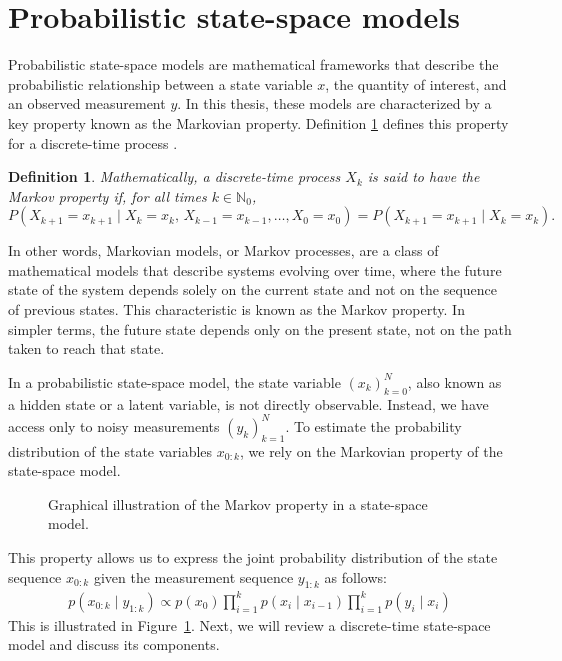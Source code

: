 \documentclass[dissertation,math,vertlayout,pdfa,colorlinks,nologo]{aaltoseries}
\newtheorem{definition}{Definition}
\begin{document}
\section{Probabilistic state-space models}
\label{sec:statistical-inference}
Probabilistic state-space models are mathematical frameworks that describe the probabilistic relationship between a state variable $x$, the quantity of interest, and an observed measurement $y$. In this thesis, these models are characterized by a key property known as the Markovian property. Definition \ref{def:markov-property} defines this property for a discrete-time process \citep{jazwinski2007stochastic, sarkka2023bayesian}.
\begin{definition} \label{def:markov-property}
    Mathematically, a discrete-time process $X_k$ is said to have the Markov property if, for all times $k \in \mathbb{N}_0$,
    \begin{equation} \label{eq:markov-property}
        P(X_{k+1} = x_{k+1} \mid X_k = x_k,\, X_{k-1} = x_{k-1}, \ldots, X_0 = x_0) = P(X_{k+1} = x_{k+1} \mid X_k = x_k).
    \end{equation}
\end{definition}
In other words, Markovian models, or Markov processes, are a class of mathematical models that describe systems evolving over time, where the future state of the system depends solely on the current state and not on the sequence of previous states. This characteristic is known as the Markov property. In simpler terms, the future state depends only on the present state, not on the path taken to reach that state.

In a probabilistic state-space model, the state variable $(x_k)_{k=0}^N$, also known as a hidden state or a latent variable, is not directly observable. Instead, we have access only to noisy measurements $(y_k)_{k = 1}^N$. To estimate the probability distribution of the state variables $x_{0:k}$, we rely on the Markovian property of the state-space model.
\begin{figure}[tb]
    \centering
    \resizebox{\columnwidth}{!}{}
    \caption{Graphical illustration of the Markov property in a state-space model.}
    \label{fig:ssm-markov}
\end{figure}
This property allows us to express the joint probability distribution of the state sequence $x_{0:k}$ given the measurement sequence $y_{1:k}$ as follows:
\begin{equation} \label{eq:SSM-as-markov-example}
    \begin{split}
        p(x_{0:k} \mid y_{1:k}) \propto p(x_0) \prod_{i=1}^{k} p(x_{i} \mid x_{i-1})  \prod_{i=1}^{k} p(y_{i} \mid x_i)
    \end{split}
\end{equation}
 This is illustrated in Figure~\ref{fig:ssm-markov}. Next, we will review a discrete-time state-space model and discuss its components. 
%
\end{document}

